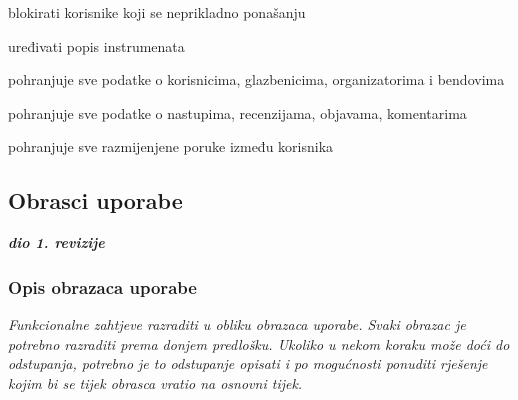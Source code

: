 \begin{packed_enum}
\item  {}

\begin{packed_enum}
	
	\item blokirati korisnike koji se neprikladno ponašanju
	\item uređivati popis instrumenata
	
\end{packed_enum}

\item  {}

\begin{packed_enum}
	
	\item pohranjuje sve podatke o korisnicima, glazbenicima, organizatorima i bendovima
	\item pohranjuje sve podatke o nastupima, recenzijama, objavama, komentarima
	\item pohranjuje sve razmijenjene poruke između korisnika 
	
\end{packed_enum}
		
\end{packed_enum}
			
\eject 
			
			
				
			\subsection{Obrasci uporabe}
				
				\textbf{\textit{dio 1. revizije}}
				
				\subsubsection{Opis obrazaca uporabe}
					\textit{Funkcionalne zahtjeve razraditi u obliku obrazaca uporabe. Svaki obrazac je potrebno razraditi prema donjem predlošku. Ukoliko u nekom koraku može doći do odstupanja, potrebno je to odstupanje opisati i po mogućnosti ponuditi rješenje kojim bi se tijek obrasca vratio na osnovni tijek.}\\
					

